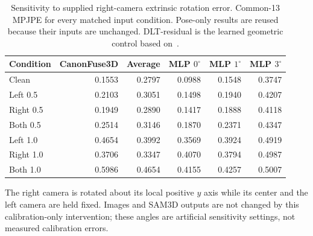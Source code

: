 \begin{table}[htbp]
\centering
\caption{Sensitivity to supplied right-camera extrinsic rotation error. Common-13 MPJPE for every matched input condition. Pose-only results are reused because their inputs are unchanged. DLT-residual is the learned geometric control based on~\cite{hartley2004multiple}.}
\label{tab:c07_calibration_mpjpe}
\small
\setlength{\tabcolsep}{4pt}
\begin{tabular}{lrrrrr}
\toprule
Condition & CanonFuse3D & Average & MLP $0^\circ$ & MLP $1^\circ$ & MLP $3^\circ$ \\
\midrule
Clean & 0.1553 & 0.2797 & 0.0988 & 0.1548 & 0.3747 \\
Left 0.5 & 0.2103 & 0.3051 & 0.1498 & 0.1940 & 0.4207 \\
Right 0.5 & 0.1949 & 0.2890 & 0.1417 & 0.1888 & 0.4118 \\
Both 0.5 & 0.2514 & 0.3146 & 0.1870 & 0.2371 & 0.4347 \\
Left 1.0 & 0.4654 & 0.3992 & 0.3569 & 0.3924 & 0.4919 \\
Right 1.0 & 0.3706 & 0.3347 & 0.4070 & 0.3794 & 0.4987 \\
Both 1.0 & 0.5986 & 0.4654 & 0.4155 & 0.4257 & 0.5007 \\
\bottomrule
\end{tabular}
\par\smallskip\begin{minipage}{\linewidth}\footnotesize The right camera is rotated about its local positive $y$ axis while its center and the left camera are held fixed. Images and SAM3D outputs are not changed by this calibration-only intervention; these angles are artificial sensitivity settings, not measured calibration errors.\end{minipage}
\end{table}

